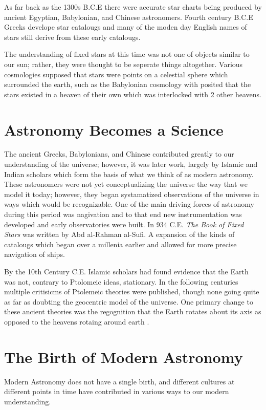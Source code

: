 As far back as the 1300s B.C.E there were accurate star charts being produced
by ancient Egyptian, Babylonian, and Chinese astronomers. Fourth century B.C.E
Greeks develope star catalougs and many of the moden day English names of stars
still derive from these early catalougs.

The understanding of fixed stars at this time was not one of objects similar to
our sun; rather, they were thought to be seperate things altogether. Various
cosmologies supposed that stars were points on a celestial sphere which
surrounded the earth, such as the Babylonian cosmology with posited that the
stars existed in a heaven of their own which was interlocked with 2 other
heavens.

\section{Astronomy Becomes a Science}
The ancient Greeks, Babylonians, and Chinese contributed greatly to our
understanding of the universe; however, it was later work, largely by Islamic
and Indian scholars which form the basis of what we think of as modern
astronomy. These astronomers were not yet conceptualizing the universe the way
that we model it today; however, they began systamatized observations of the
universe in ways which would be recognizable. One of the main driving forces of
astronomy during this period was nagivation and to that end new instrumentation
was developed and early observatories were built. In 934 C.E. \textit{The Book
of Fixed Stars} was written by Abd al-Rahman al-Sufi. A expansion of the kinds
of catalougs which began over a millenia earlier and allowed for more precise
navigation of ships. 

By the 10th Century C.E. Islamic scholars had found evidence that the Earth was not,
contrary to Ptolomeic ideas, stationary. In the following centuries multiple 
critisicms of Ptolemeic theories were published, though none going quite as far
as doubting the geocentric model of the universe. One primary change to these
ancient theories was the regognition that the Earth rotates about its axis 
as opposed to the heavens rotaing around earth \addcite. 

\section{The Birth of Modern Astronomy}
Modern Astronomy does not have a single birth, and different cultures at
different points in time have contributed in various ways to our modern understanding. 

